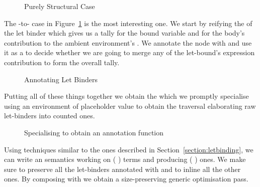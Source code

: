 \begin{figure}[h]
  \caption{Purely Structural Case}
\end{figure}

The -to- case in Figure~\ref{fig:lettoclet} is the most
interesting one. We start by reifying the  of the let binder which
gives us a tally  for the bound variable and  for the body's
contribution to the ambient environment's . We annotate the node
with  and use it as a  to decide whether we are going to
merge any of the let-bound's expression contribution  to form the
overall tally.

\begin{figure}[h]
  \caption{Annotating Let Binders}\label{fig:lettoclet}
\end{figure}

Putting all of these things together we obtain the  
which we promptly specialise using an environment of placeholder value to
obtain the traversal  elaborating raw let-binders into counted
ones.

\begin{figure}[h]
\caption{Specialising  to obtain an annotation function}
\end{figure}

Using techniques similar to the ones described in Section~\ref{section:letbinding},
we can write an  semantics working on {(  )} terms
and producing {(  )} ones. We make sure to preserve all the
let-binders annotated with  and to inline all the other ones. By composing
 with  we obtain a size-preserving generic optimisation pass.
